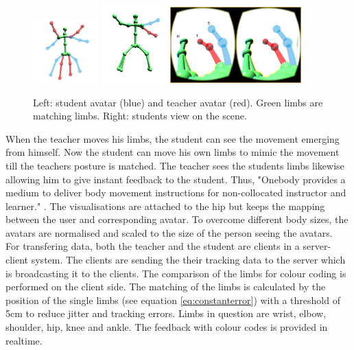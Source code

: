 \begin{figure}
	\centering
	\includegraphics[width=0.225\textwidth]{img/onebody1.png}
	\includegraphics[width=0.225\textwidth]{img/onebody2.png}
	\includegraphics[width=0.45\textwidth]{img/onebody3.png}
	\caption{Left: student avatar (blue) and teacher avatar (red). Green limbs are matching limbs. Right: students view on the scene.\cite{Reinoso2016}}
	\label{fig:ob1}
\end{figure}
When the teacher moves his limbs, the student can see the movement emerging from himself. Now the student can move his own limbs to mimic the movement till the teachers posture is matched. The teacher sees the students limbs likewise allowing him to give instant feedback to the student. Thus, "Onebody provides a medium to deliver body movement instructions for non-collocated instructor and learner." \todo. The visualisations are attached to the hip but keeps the mapping between the user and corresponding avatar. To overcome different body sizes, the avatars are normalised and scaled to the size of the person seeing the avatars.\\
For transfering data, both the teacher and the student are clients in a server-client system. The clients are sending the their tracking data to the server which is broadcasting it to the clients. The comparison of the limbs for colour coding is performed on the client side. The matching of the limbs is calculated by the position of the single limbs (see equation \eqref{eq:constanterror}) with a threshold of 5cm to reduce jitter and tracking errors. Limbs in question are wrist, elbow, shoulder, hip, knee and ankle. The feedback with colour codes is provided in realtime.\\
